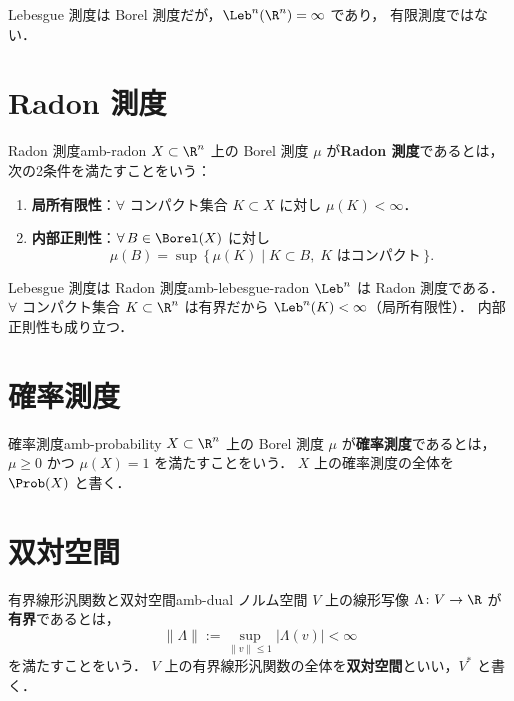 Lebesgue 測度は Borel 測度だが，$\Leb^n(\R^n) = \infty$ であり，
有限測度ではない．

\section{Radon 測度}
\label{sec:radon}

\begin{definition}{Radon 測度}{amb-radon}
  $X \subset \R^n$ 上の Borel 測度 $\mu$ が\textbf{Radon 測度}であるとは，
  次の2条件を満たすことをいう：
  \begin{enumerate}
    \item \textbf{局所有限性}：$\forall$ コンパクト集合 $K \subset X$ に対し $\mu(K) < \infty$．
    \item \textbf{内部正則性}：$\forall\, B \in \Borel(X)$ に対し
      \[
        \mu(B) = \sup\,\{\,\mu(K) \mid K \subset B,\; K \text{ はコンパクト}\,\}.
      \]
  \end{enumerate}
\end{definition}

\begin{example}{Lebesgue 測度は Radon 測度}{amb-lebesgue-radon}
  $\Leb^n$ は Radon 測度である．
  $\forall$ コンパクト集合 $K \subset \R^n$ は有界だから $\Leb^n(K) < \infty$（局所有限性）．
  内部正則性も成り立つ．
\end{example}

\section{確率測度}
\label{sec:probability}

\begin{definition}{確率測度}{amb-probability}
  $X \subset \R^n$ 上の Borel 測度 $\mu$ が\textbf{確率測度}であるとは，
  $\mu \geq 0$ かつ $\mu(X) = 1$ を満たすことをいう．
  $X$ 上の確率測度の全体を $\Prob(X)$ と書く．
\end{definition}

\section{双対空間}
\label{sec:dual}

\begin{definition}{有界線形汎関数と双対空間}{amb-dual}
  ノルム空間 $V$ 上の線形写像 $\Lambda \colon V \to \R$ が
  \textbf{有界}であるとは，
  \[
    \|\Lambda\| := \sup_{\|v\| \leq 1} |\Lambda(v)| < \infty
  \]
  を満たすことをいう．
  $V$ 上の有界線形汎関数の全体を\textbf{双対空間}といい，$V^*$ と書く．
\end{definition}


